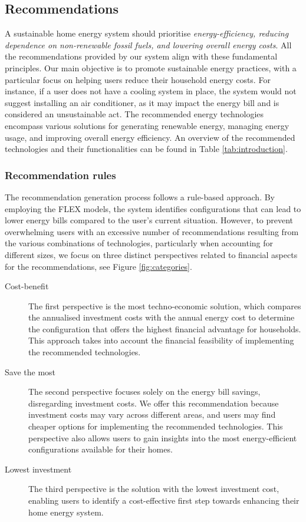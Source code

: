 \subsection{Recommendations}

A sustainable home energy system should prioritise \emph{energy-efficiency, reducing dependence on non-renewable fossil fuels, and lowering overall energy costs}. 
All the recommendations provided by our system align with these fundamental principles. 
Our main objective is to promote sustainable energy practices, with a particular focus on helping users reduce their household energy costs.
For instance, if a user does not have a cooling system in place, the system would not suggest installing an air conditioner, as it may impact the energy bill and is considered an unsustainable act.
The recommended energy technologies encompass various solutions for generating renewable energy, managing energy usage, and improving overall energy efficiency. 
An overview of the recommended technologies and their functionalities can be found in Table \ref{tab:introduction}.


\subsubsection{Recommendation rules}

The recommendation generation process follows a rule-based approach. 
By employing the FLEX models, the system identifies configurations that can lead to lower energy bills compared to the user's current situation.
However, to prevent overwhelming users with an excessive number of recommendations resulting from the various combinations of technologies, particularly when accounting for different sizes, 
we focus on three distinct perspectives related to financial aspects for the recommendations, see Figure \ref{fig:categories}.

\begin{description}
  \item[Cost-benefit] The first perspective is the most techno-economic solution, which compares the annualised investment costs with the annual energy cost to determine the configuration that offers the highest financial advantage for households. 
  This approach takes into account the financial feasibility of implementing the recommended technologies.
  \item[Save the most] The second perspective focuses solely on the energy bill savings, disregarding investment costs. 
  We offer this recommendation because investment costs may vary across different areas, and users may find cheaper options for implementing the recommended technologies.
  This perspective also allows users to gain insights into the most energy-efficient configurations available for their homes.
  \item[Lowest investment] The third perspective is the solution with the lowest investment cost, enabling users to identify a cost-effective first step towards enhancing their home energy system.
\end{description}

